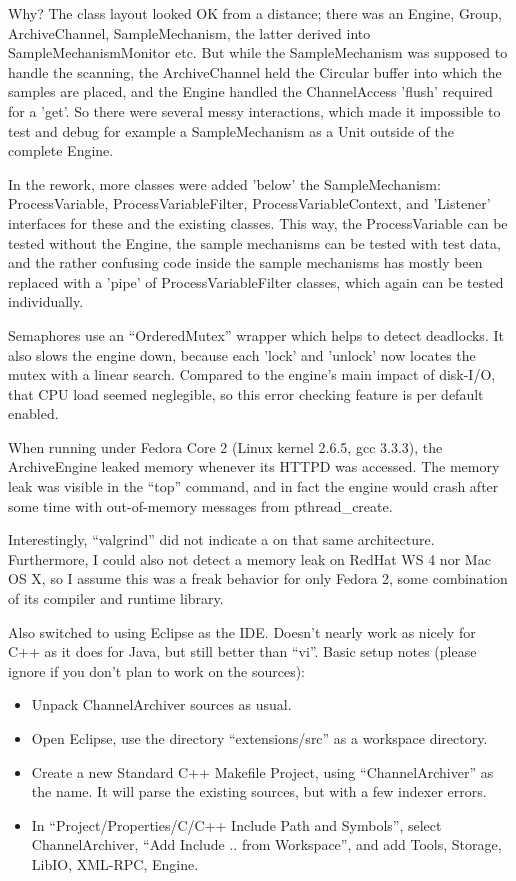 \begin{itemize}
Why? The class layout looked OK from a distance;
there was an Engine, Group, ArchiveChannel, SampleMechanism,
the latter derived into SampleMechanismMonitor etc.
But while the SampleMechanism was supposed to handle
the scanning, the ArchiveChannel held the Circular buffer
into which the samples are placed,
and the Engine handled the ChannelAccess 'flush' required
for a 'get'. So there were several messy interactions,
which made it impossible to test and debug for example a SampleMechanism
as a Unit outside of the complete Engine.

In the rework, more classes were added 'below' the SampleMechanism:
ProcessVariable, ProcessVariableFilter, ProcessVariableContext,
and 'Listener' interfaces for these and the existing classes.
This way, the ProcessVariable can be tested without the Engine,
the sample mechanisms can be tested with test data,
and the rather confusing code inside the sample mechanisms
has mostly been replaced with a 'pipe' of ProcessVariableFilter
classes, which again can be tested individually.

Semaphores use an ``OrderedMutex'' wrapper which helps
to detect deadlocks. It also slows the engine down, because
each 'lock' and 'unlock' now locates the mutex with a linear
search. Compared to the  engine's main impact of disk-I/O, that
CPU load seemed neglegible, so this error checking feature
is per default enabled.

\NOTE When running under Fedora Core 2 (Linux kernel 2.6.5,
gcc 3.3.3), the ArchiveEngine leaked memory whenever its HTTPD
was accessed. The memory leak was visible in the ``top'' command,
and in fact the engine would crash after some time with out-of-memory messages
from pthread\_create.

Interestingly, ``valgrind'' did not indicate a  on that
same architecture. Furthermore, I could also not detect a memory leak on RedHat WS 4
nor Mac OS X, so I assume this was a freak behavior for only Fedora 2,
some combination of its compiler and runtime library. 

Also switched to using Eclipse as the IDE.
Doesn't nearly work as nicely for C++ as it does for Java,
but still better than ``vi''.
Basic setup notes (please ignore if you don't plan to work
on the sources):
\begin{itemize}
\item Unpack ChannelArchiver sources as usual.
\item Open Eclipse, use the directory ``extensions/src'' as a
      workspace directory.
\item Create a new Standard C++ Makefile Project, using
      ``ChannelArchiver'' as the name. It will parse the existing
      sources, but with a few indexer errors.
\item In ``Project/Properties/C/C++ Include Path and Symbols'',
      select ChannelArchiver, ``Add Include .. from Workspace'',
      and add Tools, Storage, LibIO, XML-RPC, Engine.
\end{itemize}


\end{itemize}

